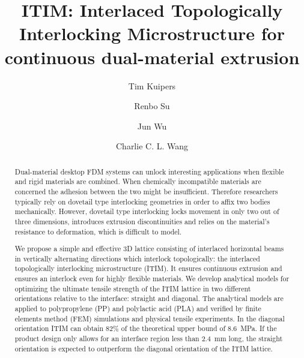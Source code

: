 \documentclass[review]{elsarticle}
\theoremstyle{definition}
\begin{document}
\baselineskip11pt 

\begin{frontmatter} 

\title{ITIM: Interlaced Topologically Interlocking Microstructure for continuous dual-material extrusion}


\author[um,tud]{Tim Kuipers}
\author[man]{Renbo Su}
\author[tud]{Jun Wu}
\author[man]{Charlie C. L. Wang}
\address[um]{Ultimaker, Utrecht, The Netherlands}
\address[tud]{Department of Sustainable Design Engineering, Delft University of Technology, The Netherlands}
\address[man]{Department of Mechanical, Aerospace \& Civil Engineering, The University of Manchester, United Kingdom}


\begin{abstract}
Dual-material desktop FDM systems can unlock interesting applications when flexible and rigid materials are combined.
When chemically incompatible materials are concerned the adhesion between the two might be insufficient.
Therefore researchers typically rely on dovetail type interlocking geometries in order to affix two bodies mechanically.
However, dovetail type interlocking locks movement in only two out of three dimensions, introduces extrusion discontinuities and relies on the material's resistance to deformation, which is difficult to model.

We propose a simple and effective 3D lattice consisting of interlaced horizontal beams in vertically alternating directions which interlock topologically: the interlaced topologically interlocking microstructure (ITIM).
It ensures continuous extrusion and ensures an interlock even for highly flexible materials.
We develop analytical models for optimizing the ultimate tensile strength of the ITIM lattice in two different orientations relative to the interface: straight and diagonal.
The analytical models are applied to polypropylene (PP) and polylactic acid (PLA) and verified by finite elements method (FEM) simulations and physical tensile experiments.
In the diagonal orientation ITIM can obtain 82\% of the theoretical upper bound of \SI{8.6}{\mega\pascal}.
If the product design only allows for an interface region less than \SI{2.4}{\milli\meter} long, the straight orientation is expected to outperform the diagonal orientation of the ITIM lattice.



\end{abstract}
\end{frontmatter}
\end{document}
